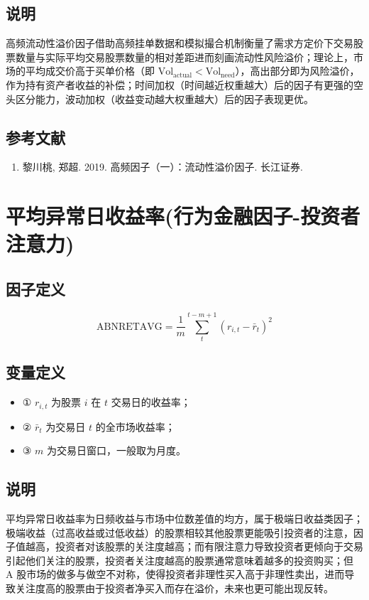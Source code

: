 \documentclass{article}
\begin{document}
\subsection{说明}
高频流动性溢价因子借助高频挂单数据和模拟撮合机制衡量了需求方定价下交易股票数量与实际平均交易股票数量的相对差距进而刻画流动性风险溢价；理论上，市场的平均成交价高于买单价格（即 \( \mathrm{Vol}_{\mathrm{actual}} < \mathrm{Vol}_{\mathrm{need}} \)），高出部分即为风险溢价，作为持有资产者收益的补偿；时间加权（时间越近权重越大）后的因子有更强的空头区分能力，波动加权（收益变动越大权重越大）后的因子表现更优。

\subsection{参考文献}
\begin{enumerate}
    \item 黎川桃, 郑超. 2019. 高频因子（一）：流动性溢价因子. 长江证券.
\end{enumerate}

\section{平均异常日收益率(行为金融因子-投资者注意力)}

\subsection{因子定义}
\begin{equation}
    \mathrm{ABNRETAVG} = \frac{1}{m} \sum_{t}^{t-m+1} (r_{i,t} - \bar{r}_t)^2
\end{equation}

\subsection{变量定义}
\begin{itemize}
    \item ① \( r_{i,t} \) 为股票 \( i \) 在 \( t \) 交易日的收益率；
    \item ② \( \bar{r}_t \) 为交易日 \( t \) 的全市场收益率；
    \item ③ \( m \) 为交易日窗口，一般取为月度。
\end{itemize}

\subsection{说明}
平均异常日收益率为日频收益与市场中位数差值的均方，属于极端日收益类因子；极端收益（过高收益或过低收益）的股票相较其他股票更能吸引投资者的注意，因子值越高，投资者对该股票的关注度越高；而有限注意力导致投资者更倾向于交易引起他们关注的股票，投资者关注度越高的股票通常意味着越多的投资购买；但 A 股市场的做多与做空不对称，使得投资者非理性买入高于非理性卖出，进而导致关注度高的股票由于投资者净买入而存在溢价，未来也更可能出现反转。
\end{document}
